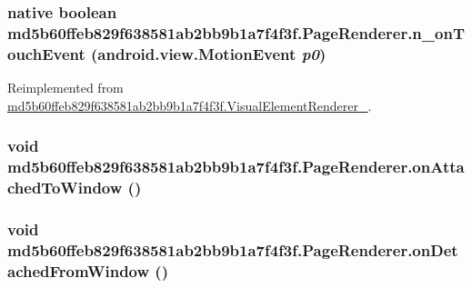\hypertarget{classmd5b60ffeb829f638581ab2bb9b1a7f4f3f_1_1_page_renderer_e06757e6f6dff9d51c3f4846c4ccae1f}{
\subsubsection[{n\_\-onTouchEvent}]{\setlength{\rightskip}{0pt plus 5cm}native boolean md5b60ffeb829f638581ab2bb9b1a7f4f3f.PageRenderer.n\_\-onTouchEvent (android.view.MotionEvent {\em p0})}}
\label{classmd5b60ffeb829f638581ab2bb9b1a7f4f3f_1_1_page_renderer_e06757e6f6dff9d51c3f4846c4ccae1f}




Reimplemented from \hyperlink{classmd5b60ffeb829f638581ab2bb9b1a7f4f3f_1_1_visual_element_renderer__1_bf46ffd446313b87383a085a60d65dd4}{md5b60ffeb829f638581ab2bb9b1a7f4f3f.VisualElementRenderer\_}.\hypertarget{classmd5b60ffeb829f638581ab2bb9b1a7f4f3f_1_1_page_renderer_50c8e09a94fb59f2f11fa7ed1f7296e2}{
\subsubsection[{onAttachedToWindow}]{\setlength{\rightskip}{0pt plus 5cm}void md5b60ffeb829f638581ab2bb9b1a7f4f3f.PageRenderer.onAttachedToWindow ()}}
\label{classmd5b60ffeb829f638581ab2bb9b1a7f4f3f_1_1_page_renderer_50c8e09a94fb59f2f11fa7ed1f7296e2}


\hypertarget{classmd5b60ffeb829f638581ab2bb9b1a7f4f3f_1_1_page_renderer_dabdc0dbf9335603861e999017656a19}{
\subsubsection[{onDetachedFromWindow}]{\setlength{\rightskip}{0pt plus 5cm}void md5b60ffeb829f638581ab2bb9b1a7f4f3f.PageRenderer.onDetachedFromWindow ()}}
\label{classmd5b60ffeb829f638581ab2bb9b1a7f4f3f_1_1_page_renderer_dabdc0dbf9335603861e999017656a19}


